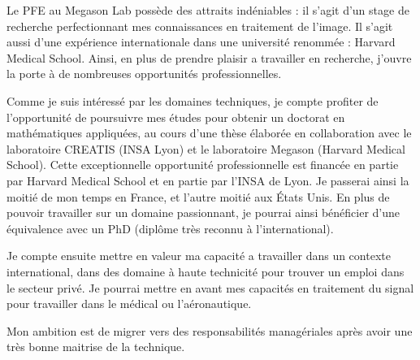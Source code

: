 Le PFE au Megason Lab possède des attraits indéniables :
il s'agit d'un stage de recherche perfectionnant mes connaissances en traitement de l'image.
Il s'agit aussi d'une expérience internationale dans une université renommée : Harvard Medical School.
Ainsi, en plus de prendre plaisir a travailler en recherche, j'ouvre la porte à de nombreuses opportunités professionnelles.

Comme je suis intéressé par les domaines techniques,
je compte profiter de l'opportunité de poursuivre mes études pour obtenir un doctorat en mathématiques appliquées,
au cours d'une thèse élaborée en collaboration avec le laboratoire CREATIS (INSA Lyon)
et le laboratoire Megason (Harvard Medical School).
Cette exceptionnelle opportunité professionnelle est financée en partie par Harvard Medical School
et en partie par l'INSA de Lyon. Je passerai ainsi la moitié de mon temps en France, et l'autre moitié aux États Unis.
En plus de pouvoir travailler sur un domaine passionnant,
je pourrai ainsi bénéficier d'une équivalence avec un PhD (diplôme très reconnu à l'international). 

Je compte ensuite mettre en valeur ma capacité a travailler dans un contexte international,
dans des domaine à haute technicité pour trouver un emploi  dans le secteur privé.
Je pourrai mettre en avant mes capacités en traitement du signal pour travailler dans le médical ou l'aéronautique.

Mon ambition est de migrer vers des responsabilités managériales après avoir une très bonne maitrise de la technique.

